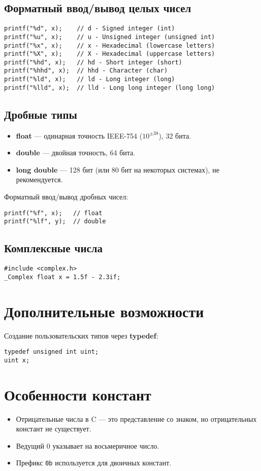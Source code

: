 \documentclass[a4paper,12pt]{article}
\begin{document}
\subsection{Форматный ввод/вывод целых чисел}
\begin{lstlisting}
printf("%d", x);    // d - Signed integer (int)
printf("%u", x);    // u - Unsigned integer (unsigned int)
printf("%x", x);    // x - Hexadecimal (lowercase letters)
printf("%X", x);    // X - Hexadecimal (uppercase letters)
printf("%hd", x);   // hd - Short integer (short)
printf("%hhd", x);  // hhd - Character (char)
printf("%ld", x);   // ld - Long integer (long)
printf("%lld", x);  // lld - Long long integer (long long)
\end{lstlisting}

\subsection{Дробные типы}
\begin{itemize}
    \item \textbf{float} — одинарная точность IEEE-754 ($10^{\pm38}$), 32 бита.
    \item \textbf{double} — двойная точность, 64 бита.
    \item \textbf{long double} — 128 бит (или 80 бит на некоторых системах), не рекомендуется.
\end{itemize}

Форматный ввод/вывод дробных чисел:
\begin{lstlisting}
printf("%f", x);   // float
printf("%lf", y);  // double
\end{lstlisting}

\subsection{Комплексные числа}
\begin{lstlisting}
#include <complex.h>
_Complex float x = 1.5f - 2.3if;
\end{lstlisting}

\section{Дополнительные возможности}
Создание пользовательских типов через \textbf{typedef}:
\begin{lstlisting}
typedef unsigned int uint;
uint x;
\end{lstlisting}

\section{Особенности констант}
\begin{itemize}
    \item Отрицательные числа в C — это представление со знаком, но отрицательных констант не существует.
    \item Ведущий 0 указывает на восьмеричное число.
    \item Префикс \texttt{0b} используется для двоичных констант.
\end{itemize}
\end{document}
